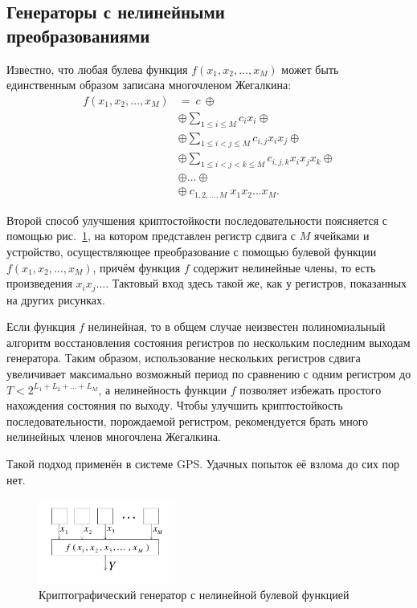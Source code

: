 \subsection[Генераторы с нелинейными преобразованиями]{Генераторы с нелинейными \protect\\ преобразованиями}

Известно, что любая булева функция $f(x_1, x_2,  \dots, x_M)$ может быть единственным образом записана многочленом Жегалкина:
\[ \begin{array}{ll}
    f(x_1, x_2, \dots, x_M) & = ~c~ \oplus \\
    & \oplus \sum\limits_{1 \leq i \leq M} c_i x_i \oplus \\
    & \oplus \sum\limits_{1 \leq i < j \leq M} c_{i,j} x_i x_j \oplus \\
    & \oplus \sum\limits_{1 \leq i < j < k \leq M} c_{i,j,k} x_i x_j x_k \oplus \\
    & \oplus \dots \oplus \\
    & \oplus ~ c_{1,2,\dots,M} ~ x_1 x_2 \dots x_M.
\end{array} \]


Второй способ улучшения криптостойкости последовательности поясняется с помощью рис.~\ref{fig:lfsr-zhegalkin}, на котором представлен регистр сдвига с $M$ ячейками и устройство, осуществляющее преобразование с помощью булевой функции $f(x_1, x_2, \dots, x_M)$, причём функция $f$ содержит нелинейные члены, то есть произведения $x_i x_j \dots$. Тактовый вход здесь такой же, как у регистров, показанных на других рисунках.

Если функция $f$ нелинейная, то в общем случае неизвестен полиномиальный алгоритм восстановления состояния регистров по нескольким последним выходам генератора. Таким образом, использование нескольких регистров сдвига увеличивает максимально возможный период по сравнению с одним регистром до $T < 2^{L_1 + L_2 + \dots + L_M}$, а нелинейность функции $f$ позволяет избежать простого нахождения состояния по выходу. Чтобы улучшить криптостойкость последовательности, порождаемой регистром, рекомендуется брать много нелинейных членов многочлена Жегалкина.

Такой подход применён в системе GPS. Удачных попыток её взлома до сих пор нет.

\begin{figure}[!ht]
    \centering
	\includegraphics[width=0.4\textwidth]{pic/lfsr-zhegalkin}
    \caption{Криптографический генератор с нелинейной булевой функцией\label{fig:lfsr-zhegalkin}}
\end{figure}
